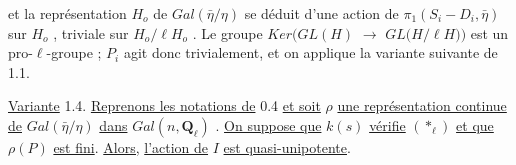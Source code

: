 et la représentation  $H_o$  de  $Gal(\bar{\eta}/\eta)$  se déduit d'une action de  $\pi_1(S_i-D_i,\bar{\eta})$  sur $H_o$ , triviale sur  $H_o/\ell H_o$ . Le groupe  $Ker(GL(H)$ $\longrightarrow$ $GL(H/$$\ell$$H))$  est un pro-$\ell$-groupe ; $P_i$  agit donc trivialement, et on applique la variante suivante de 1.1.

\underline{Variante} 1.4.  \underline{Reprenons les notations de} 0.4 \underline{et soit}  $\rho$  \underline{une représentation continue de} $Gal(\bar{\eta}/\eta)$  \underline{dans}  $Gal(n,\mathbf{Q}_\ell)$ . \underline{On suppose que}  $k(s)$  \underline{vérifie}  $(\ast_\ell)$  \underline{et que}  $\rho(P)$ \underline{est fini}. \underline{Alors,} \underline{l'action de}  $I$  \underline{est quasi-unipotente}.


